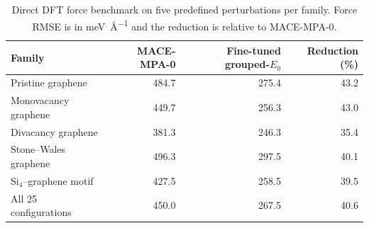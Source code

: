 \begin{table}[!htbp]
  \centering
  \caption{Direct DFT force benchmark on five predefined perturbations per
  family. Force RMSE is in \si{\milli\electronvolt\per\angstrom} and the reduction is relative to
  MACE-MPA-0.}
  \label{tab:si_balanced_force}
  \begin{tabular}{lrrr}
    \toprule
    Family & MACE-MPA-0 & Fine-tuned grouped-$E_0$ & Reduction (\%) \\
    \midrule
    Pristine graphene & 484.7 & 275.4 & 43.2 \\
    Monovacancy graphene & 449.7 & 256.3 & 43.0 \\
    Divacancy graphene & 381.3 & 246.3 & 35.4 \\
    Stone--Wales graphene & 496.3 & 297.5 & 40.1 \\
    Si$_4$--graphene motif & 427.5 & 258.5 & 39.5 \\
    \midrule
    All 25 configurations & 450.0 & 267.5 & 40.6 \\
    \bottomrule
  \end{tabular}
\end{table}
